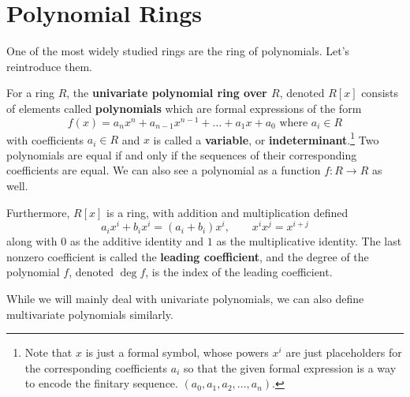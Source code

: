 \section{Polynomial Rings} 

  One of the most widely studied rings are the ring of polynomials. Let's reintroduce them. 

  \begin{definition}
    For a ring $R$, the \textbf{univariate polynomial ring over $R$}, denoted $R[x]$ consists of elements called \textbf{polynomials} which are formal expressions of the form 
    \begin{equation}
      f(x) = a_nx^n + a_{n-1}x^{n-1} + \dots + a_1x + a_0 \text{ where } a_i \in R
    \end{equation}
    with coefficients $a_i \in R$ and $x$ is called a \textbf{variable}, or \textbf{indeterminant}.\footnote{Note that $x$ is just a formal symbol, whose powers $x^i$ are just placeholders for the corresponding coefficients $a_i$ so that the given formal expression is a way to encode the finitary sequence. $(a_0, a_1, a_2, ..., a_n)$.} Two polynomials are equal if and only if the sequences of their corresponding coefficients are equal. We can also see a polynomial as a function $f: R \rightarrow R$ as well. 

    Furthermore, $R[x]$ is a ring, with addition and multiplication defined
    \begin{equation}
      a_i x^i + b_i x^i = (a_i + b_i) x^i, \qquad x^ix^j = x^{i+j}
    \end{equation}
    along with $0$ as the additive identity and $1$ as the multiplicative identity. The last nonzero coefficient is called the \textbf{leading coefficient}, and the degree of the polynomial $f$, denoted $\deg f$, is the index of the leading coefficient.
  \end{definition} 

  While we will mainly deal with univariate polynomials, we can also define multivariate polynomials similarly. 

